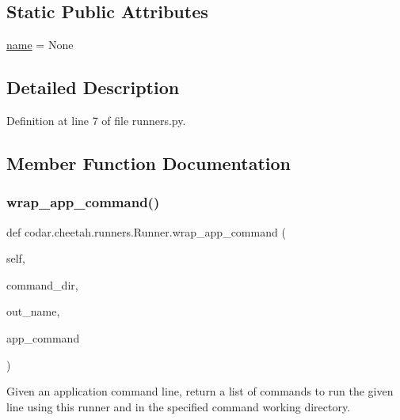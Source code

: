 \subsection*{Static Public Attributes}
\begin{DoxyCompactItemize}
\item 
\hyperlink{classcodar_1_1cheetah_1_1runners_1_1_runner_aa2c0d84fbe4396e2a42cb84923c3a264}{name} = None
\end{DoxyCompactItemize}


\subsection{Detailed Description}


Definition at line 7 of file runners.\+py.



\subsection{Member Function Documentation}
\mbox{\label{classcodar_1_1cheetah_1_1runners_1_1_runner_a542d501b4c640bb9c27b2777a831c351}} 
\subsubsection{\texorpdfstring{wrap\+\_\+app\+\_\+command()}{wrap\_app\_command()}}
{\footnotesize\ttfamily def codar.\+cheetah.\+runners.\+Runner.\+wrap\+\_\+app\+\_\+command (\begin{DoxyParamCaption}\item[{}]{self,  }\item[{}]{command\+\_\+dir,  }\item[{}]{out\+\_\+name,  }\item[{}]{app\+\_\+command }\end{DoxyParamCaption})}

\begin{DoxyVerb}Given an application command line, return a list of commands to
run the given line using this runner and in the specified command
working directory.
\end{DoxyVerb}
 

